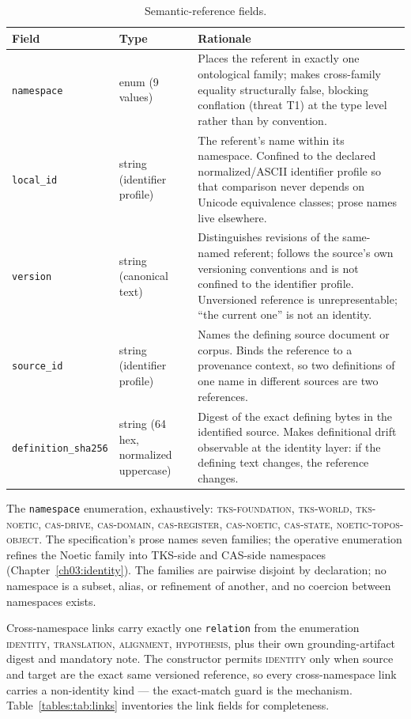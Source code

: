 \begin{table}[htbp]
\centering
\caption{Semantic-reference fields.}
\label{tables:tab:semref}
\begin{tabular}{@{}p{}p{}p{}@{}}
\toprule
Field & Type & Rationale \\
\midrule
\texttt{namespace} & enum (9 values) & Places the referent in exactly one ontological family; makes cross-family equality structurally false, blocking conflation (threat T1) at the type level rather than by convention. \\
\addlinespace
\texttt{local\_id} & string (identifier profile) & The referent's name within its namespace. Confined to the declared normalized/ASCII identifier profile so that comparison never depends on Unicode equivalence classes; prose names live elsewhere. \\
\addlinespace
\texttt{version} & string (canonical text) & Distinguishes revisions of the same-named referent; follows the source's own versioning conventions and is not confined to the identifier profile. Unversioned reference is unrepresentable; ``the current one'' is not an identity. \\
\addlinespace
\texttt{source\_id} & string (identifier profile) & Names the defining source document or corpus. Binds the reference to a provenance context, so two definitions of one name in different sources are two references. \\
\addlinespace
\texttt{definition\_sha256} & string (64 hex, normalized uppercase) & Digest of the exact defining bytes in the identified source. Makes definitional drift observable at the identity layer: if the defining text changes, the reference changes. \\
\bottomrule
\end{tabular}
\end{table}

The \texttt{namespace} enumeration, exhaustively: \textsc{tks-foundation}, \textsc{tks-world}, \textsc{tks-noetic}, \textsc{cas-drive}, \textsc{cas-domain}, \textsc{cas-register}, \textsc{cas-noetic}, \textsc{cas-state}, \textsc{noetic-topos-object}. The specification's prose names seven families; the operative enumeration refines the Noetic family into TKS-side and CAS-side namespaces (Chapter~\ref{ch03:identity}). The families are pairwise disjoint by declaration; no namespace is a subset, alias, or refinement of another, and no coercion between namespaces exists.

Cross-namespace links carry exactly one \texttt{relation} from the enumeration \textsc{identity}, \textsc{translation}, \textsc{alignment}, \textsc{hypothesis}, plus their own grounding-artifact digest and mandatory note. The constructor permits \textsc{identity} only when source and target are the exact same versioned reference, so every cross-namespace link carries a non-identity kind --- the exact-match guard is the mechanism. Table~\ref{tables:tab:links} inventories the link fields for completeness.

